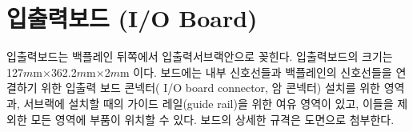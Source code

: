 \section{입출력보드 (I/O Board)}
입출력보드는 백플레인 뒤쪽에서 입출력서브랙안으로 꽂힌다.
입출력보드의 크기는 127$m$m$\times$362.2$m$m$\times$2$m$m 이다.
보드에는 내부 신호선들과 백플레인의 신호선들을 연결하기 위한 입출력 보드 콘넥터( I/O board connector, 암 콘넥터)
설치를 위한 영역과, 서브랙에 설치할 때의 가이드 레일(guide rail)을
위한 여유 영역이 있고,
이들을 제외한 모든 영역에 부품이 위치할 수 있다. 보드의 상세한 규격은 도면으로 첨부한다.
%
